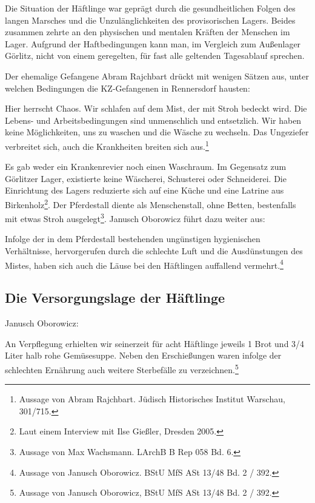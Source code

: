 Die Situation der Häftlinge war geprägt durch die gesundheitlichen Folgen des langen Marsches und die Unzulänglichkeiten des provisorischen Lagers. Beides zusammen zehrte an den physischen und mentalen Kräften der Menschen im Lager. Aufgrund der Haftbedingungen kann man, im Vergleich zum Außenlager Görlitz, nicht von einem geregelten, für fast alle geltenden Tagesablauf sprechen. 

Der ehemalige Gefangene Abram Rajchbart drückt mit wenigen Sätzen aus, unter welchen Bedingungen die KZ-Gefangenen in Rennersdorf hausten:

\begin{leftbar} 
Hier herrscht Chaos. Wir schlafen auf dem Mist, der mit Stroh bedeckt wird. Die Lebens- und Arbeitsbedingungen sind unmenschlich und entsetzlich. Wir haben keine Möglichkeiten, uns zu waschen und die Wäsche zu wechseln. Das Ungeziefer verbreitet sich, auch die Krankheiten breiten sich aus.\footnote{Aussage von Abram Rajchbart. Jüdisch Historisches Institut Warschau, 301/715.}
\end{leftbar}

Es gab weder ein Krankenrevier noch einen Waschraum. Im Gegensatz zum Görlitzer Lager, existierte keine Wäscherei, Schusterei oder Schneiderei. Die Einrichtung des Lagers reduzierte sich auf eine Küche und eine Latrine aus Birkenholz\footnote{Laut einem Interview  mit Ilse Gießler, Dresden 2005.}. Der Pferdestall diente als \glqq Menschenstall\grqq, ohne Betten, bestenfalls mit etwas Stroh ausgelegt\footnote{Aussage von Max Wachsmann. LArchB B Rep 058 Bd. 6.}. Janusch Oborowicz führt dazu weiter aus:

\begin{leftbar} 
Infolge der in dem Pferdestall bestehenden ungünstigen hygienischen Verhältnisse, hervorgerufen durch die schlechte Luft und die Ausdünstungen des Mistes, haben sich auch die Läuse bei den Häftlingen auffallend vermehrt.\footnote{Aussage von Janusch Oborowicz. BStU MfS ASt 13/48 Bd. 2 / 392.}
\end{leftbar}




\subsection{Die Versorgungslage der Häftlinge}


Janusch Oborowicz:
\begin{leftbar} 
An Verpflegung erhielten wir seinerzeit für acht Häftlinge jeweils 1 Brot und 3/4 Liter halb rohe Gemüsesuppe. Neben den Erschießungen waren infolge der schlechten Ernährung auch weitere Sterbefälle zu verzeichnen.\footnote{Aussage von Janusch Oborowicz, BStU MfS ASt 13/48 Bd. 2 / 392.}
\end{leftbar}

